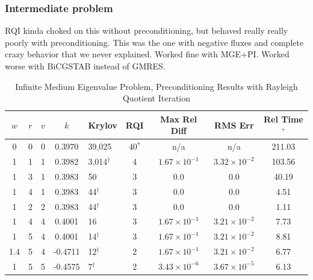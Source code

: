 \documentclass[preprint,12pt]{elsarticle}
\begin{document}
\subsubsection{Intermediate problem}
RQI kinda choked on this without preconditioning, but behaved really really poorly with preconditioning. This was the one with negative fluxes and complete crazy behavior that we never explained. Worked fine with MGE+PI. Worked worse with BiCGSTAB instead of GMRES. 

\begin{table}[!h]
\caption{Infinite Medium Eigenvalue Problem, Preconditioning Results with Rayleigh Quotient Iteration}
\begin{center}
\begin{tabular}{| c | c | c | c | l | c | c | c | c |}
\hline
$w$ & $r$ & $v$ & $k$ & Krylov & RQI & Max Rel Diff & RMS Err & Rel Time$^{+}$ \\[0.5ex]
\hline
0    & 0 & 0 & 0.3970 & 39,025              & 40$^{*}$  & n/a & n/a & 211.03 \\%
1    & 1 & 1 & 0.3982 & 3,014$^{\dag}$ & 4 & $1.67 \times 10^{-1}$ & $3.32 \times 10^{-2}$ & 103.56 \\%
1    & 3 & 1 & 0.3983 & 50                     & 3 & 0.0 & 0.0 & 40.19 \\ %
1    & 4 & 1 & 0.3983 & 44$^{\dag}$      & 3 & 0.0 & 0.0 & 4.51 \\ %
1    & 2 & 2 & 0.3983 & 44$^{\dag}$      & 3 & 0.0 & 0.0 & 1.11 \\ %
1    & 4 & 4 & 0.4001 & 16                     & 3 & $1.67 \times 10^{-1}$ & $3.21 \times 10^{-2}$ & 7.73 \\ %
1    & 5 & 4 & 0.4001 & 14$^{\dag}$     & 3 & $1.67 \times 10^{-1}$ & $3.21 \times 10^{-2}$ & 8.81 \\ %
1.4 & 5 & 4 & -0.4711 & 12$^{\dag}$    & 2 & $1.67 \times 10^{-1}$ & $3.21 \times 10^{-2}$ & 6.77 \\ %
1    & 5 & 5 & -0.4575 & 7$^{\dag}$      & 2 & $3.43 \times 10^{-6}$ & $3.67 \times 10^{-5}$ & 6.13 \\ %

\end{tabular}
\end{center}
\end{table}
\end{document}
